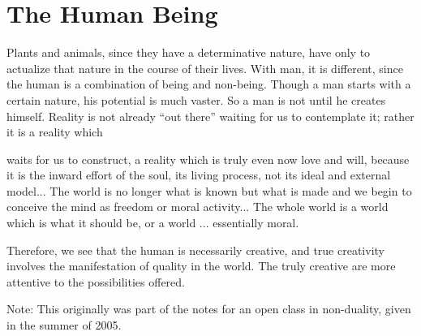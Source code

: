 \section{The Human Being}

Plants and animals, since they have a determinative nature, have only to actualize that nature in the course of their lives. With man, it is different, since the human is a combination of being and non-being. Though a man starts with a certain nature, his potential is much vaster. So a man is not until he creates himself. Reality is not already ``out there'' waiting for us to contemplate it; rather it is a reality which

\begin{quotex}
waits for us to construct, a reality which is truly even now love and will, because it is the inward effort of the soul, its living process, not its ideal and external model... The world is no longer what is known but what is made and we begin to conceive the mind as freedom or moral activity... The whole world is a world which is what it should be, or a world ... essentially moral.
\end{quotex}


Therefore, we see that the human is necessarily creative, and true creativity involves the manifestation of quality in the world. The truly creative are more attentive to the possibilities offered.

Note: This originally was part of the notes for an open class in non-duality, given in the summer of 2005.



